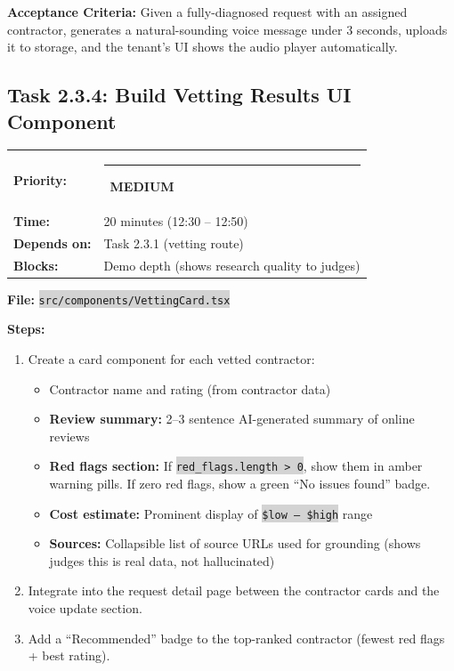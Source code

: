 \documentclass[11pt, a4paper]{article}
\newcommand{\medpri}{\textcolor{medgreen}{\rule{6pt}{6pt}}~\textcolor{medgreen}{\scriptsize\textbf{MEDIUM}}}
\newcommand{\code}[1]{\texttt{\small\colorbox{lightgray}{#1}}}
\begin{document}
\textbf{Acceptance Criteria:} Given a fully-diagnosed request with an assigned contractor, generates a natural-sounding voice message under 3 seconds, uploads it to storage, and the tenant's UI shows the audio player automatically.

\vspace{1em}

\subsection{Task 2.3.4: Build Vetting Results UI Component}

\begin{tabularx}{\textwidth}{lX}
\textbf{Priority:} & \medpri \\
\textbf{Time:} & 20 minutes (12:30 -- 12:50) \\
\textbf{Depends on:} & Task 2.3.1 (vetting route) \\
\textbf{Blocks:} & Demo depth (shows research quality to judges) \\
\end{tabularx}

\vspace{0.3em}

\textbf{File:} \code{src/components/VettingCard.tsx}

\textbf{Steps:}
\begin{enumerate}[leftmargin=2em, itemsep=2pt]
  \item Create a card component for each vetted contractor:
    \begin{itemize}[itemsep=1pt]
      \item Contractor name and rating (from contractor data)
      \item \textbf{Review summary:} 2--3 sentence AI-generated summary of online reviews
      \item \textbf{Red flags section:} If \code{red\_flags.length > 0}, show them in amber warning pills. If zero red flags, show a green ``No issues found'' badge.
      \item \textbf{Cost estimate:} Prominent display of \code{\$low -- \$high} range
      \item \textbf{Sources:} Collapsible list of source URLs used for grounding (shows judges this is real data, not hallucinated)
    \end{itemize}
  \item Integrate into the request detail page between the contractor cards and the voice update section.
  \item Add a ``Recommended'' badge to the top-ranked contractor (fewest red flags + best rating).
\end{enumerate}
\end{document}
